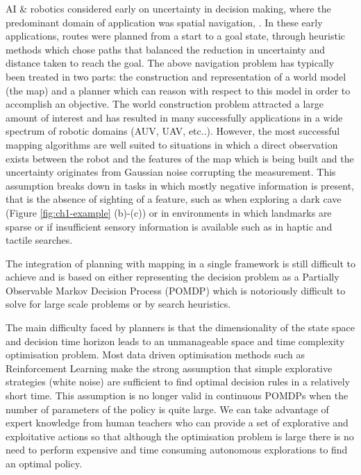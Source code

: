 AI \& robotics considered early on uncertainty in decision making, where the predominant domain of application 
was spatial navigation, \cite{ActingUncertainty_1996}. In these early applications, routes were planned 
from a start to a goal state, through heuristic methods which chose paths that balanced the reduction in uncertainty and 
distance taken to reach the goal. The above navigation problem has typically been treated in two parts:
the construction and representation of a world model (the map) and a planner which can reason with respect 
to this model in order to accomplish an objective. The world construction problem attracted a large amount of 
interest and has resulted in many successfully applications in a wide spectrum of robotic domains (AUV, UAV, etc..). 
However, the most successful mapping algorithms are well suited to situations in which a direct observation exists between the 
robot and the features of the map which is being built and the uncertainty originates from Gaussian noise corrupting the measurement. 
This assumption breaks down in tasks in which mostly negative information is present, that is the absence of sighting of a feature,
such as when exploring a dark cave (Figure \ref{fig:ch1-example} (b)-(c)) or in environments in which landmarks are sparse or if 
insufficient sensory information is available such as in haptic and tactile searches.

The integration of planning with mapping in a single framework is still difficult to achieve and is based on either 
representing the decision problem as a Partially Observable Markov Decision Process (POMDP) which is notoriously difficult 
to solve for large scale problems or by search heuristics.  

The main difficulty faced by planners is that the dimensionality of the state space and decision time horizon leads 
to an unmanageable space and time complexity optimisation problem. Most data driven optimisation methods such as 
Reinforcement Learning make the strong assumption that simple explorative strategies (white noise) are sufficient 
to find optimal decision rules in a relatively short time. This assumption is no longer valid in continuous POMDPs 
when the number of parameters of the policy is quite large. We can take advantage of expert knowledge from 
human teachers who can provide a set of explorative and exploitative actions so that although the optimisation 
problem is large there is no need to perform expensive and time consuming autonomous explorations to find an optimal policy. 


